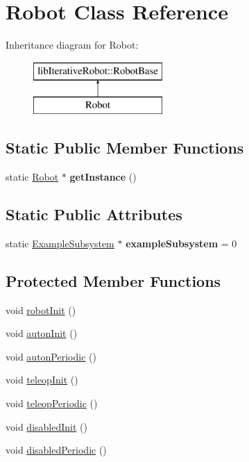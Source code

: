 \hypertarget{class_robot}{}\section{Robot Class Reference}
\label{class_robot}
Inheritance diagram for Robot\+:\begin{figure}[H]
\begin{center}
\leavevmode
\includegraphics[height=2.000000cm]{class_robot}
\end{center}
\end{figure}
\subsection*{Static Public Member Functions}
\begin{DoxyCompactItemize}
\item 
\mbox{\label{class_robot_ac6f19dc31b435f8a2d43944ba49286d0}} 
static \mbox{\hyperlink{class_robot}{Robot}} $\ast$ {\bfseries get\+Instance} ()
\end{DoxyCompactItemize}
\subsection*{Static Public Attributes}
\begin{DoxyCompactItemize}
\item 
\mbox{\label{class_robot_a64c0207f1f73a8a95b5c5dd4ba95209d}} 
static \mbox{\hyperlink{class_example_subsystem}{Example\+Subsystem}} $\ast$ {\bfseries example\+Subsystem} = 0
\end{DoxyCompactItemize}
\subsection*{Protected Member Functions}
\begin{DoxyCompactItemize}
\item 
void \mbox{\hyperlink{class_robot_a0ade19d412e58249d9f7a138d306130c}{robot\+Init}} ()
\item 
void \mbox{\hyperlink{class_robot_af5bd4d345ec522b70bdc5cf2b17ffa49}{auton\+Init}} ()
\item 
void \mbox{\hyperlink{class_robot_a51cab9afb43b369593ca189101b25b26}{auton\+Periodic}} ()
\item 
void \mbox{\hyperlink{class_robot_a8fc4fbb8f758d7223d062e1b4a915232}{teleop\+Init}} ()
\item 
void \mbox{\hyperlink{class_robot_a78f62f5d6eb05e27bfa1998fc35a519c}{teleop\+Periodic}} ()
\item 
void \mbox{\hyperlink{class_robot_a34f8bfa41ab64deae701c5583f619e78}{disabled\+Init}} ()
\item 
void \mbox{\hyperlink{class_robot_a9d35b3c9b4de467c7435d0cc6f17b33b}{disabled\+Periodic}} ()
\end{DoxyCompactItemize}


